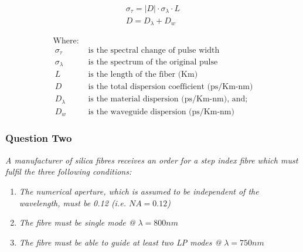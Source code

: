 \documentclass[colorlinks,11pt,a4paper,normalphoto,withhyper,ragged2e]{altareport}
\begin{document}
\begin{paracol}{2}

\medskip

\setlength{\jot}{4ex}
\begin{gather}
	\sigma_{\tau} = \lvert D \rvert \cdot \sigma_{\lambda} \cdot L
	\label{eqn:dispersion}\\
	D = D_{\lambda} + D_{w}
	\label{eqn:dispersion_mat_wg}
\end{gather}

\switchcolumn

\setlength{\jot}{1ex}
\begin{align}
	\text{Where:}& \nonumber\\\
	\sigma_{\tau} & \text{ is the spectral change of pulse width} \nonumber\\\
	\sigma_{\lambda} & \text{ is the spectrum of the original pulse} \nonumber\\\
	L & \text{ is the length of the fiber (Km)} \nonumber\\\
	D & \text{ is the total dispersion coefficient (ps/Km-nm)} \nonumber\\\
	D_{\lambda} & \text{ is the material dispersion (ps/Km-nm), and;} \nonumber\\\
	D_{w} & \text{ is the waveguide dispersion (ps/Km-nm)} \nonumber\
\end{align}


\end{paracol}


\newpage




\subsubsection{Question Two}
\textit{A manufacturer of silica fibres receives an order for a step index fibre which must fulfil the three following conditions:}

\begin{enumerate}[leftmargin=1cm, label={\textit{\bfseries C\arabic*:}}]
	\item \textit{The numerical aperture, which is assumed to be independent of the wavelength, must be 0.12 (i.e. $NA=0.12$)}
	\item \textit{The fibre must be single mode @ $\lambda = 800 nm$}
	\item \textit{The fibre must be able to guide at least two LP modes @  $\lambda = 750 nm$}
\end{enumerate}
\end{document}
